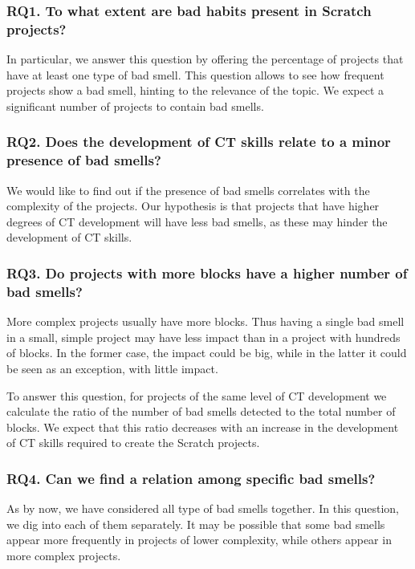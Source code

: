 \subsubsection{RQ1. To what extent are bad habits present in Scratch projects?}
\label{subsubsec:RQ1}

In particular, we answer this question by offering the percentage of projects that have at least one type of bad smell. This question allows to see how frequent projects show a bad smell, hinting to the relevance of the topic. We expect a significant number of projects to contain bad smells.

\subsubsection{RQ2. Does the development of CT skills relate to a minor presence of bad smells?}
\label{subsubsec:RQ2}

We would like to find out if the presence of bad smells correlates with the complexity of the projects. Our hypothesis is that projects that have higher degrees of CT development will have less bad smells, as these may hinder the development of CT skills.

\subsubsection{RQ3. Do projects with more blocks have a higher number of bad smells?}
\label{subsubsec:RQ3}

More complex projects usually have more blocks. Thus having a single bad smell in a small, simple project may have less impact than in a project with hundreds of blocks. In the former case, the impact could be big, while in the latter it could be seen as an exception, with little impact.

To answer this question, for projects of the same level of CT development we calculate the ratio of the number of bad smells detected to the total number of blocks. We expect that this ratio decreases with an increase in the development of CT skills required to create the Scratch projects.

\subsubsection{RQ4. Can we find a relation among specific bad smells?}
\label{subsubsec:RQ4}

As by now, we have considered all type of bad smells together. In this question, we dig into each of them separately. It may be possible that some bad smells appear more frequently in projects of lower complexity, while others appear in more complex projects.

